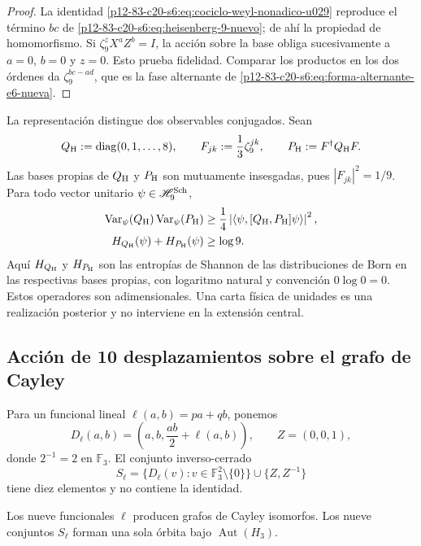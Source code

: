 \begin{proof}
La identidad \eqref{p12-83-c20-s6:eq:cociclo-weyl-nonadico-u029} reproduce el término
\(bc\) de \eqref{p12-83-c20-s6:eq:heisenberg-9-nuevo}; de ahí la propiedad de
homomorfismo. Si \(\zeta_9^zX^aZ^b=I\), la acción sobre la base obliga
sucesivamente a \(a=0\), \(b=0\) y \(z=0\). Esto prueba fidelidad. Comparar
los productos en los dos órdenes da
\(\zeta_9^{bc-ad}\), que es la fase alternante de
\eqref{p12-83-c20-s6:eq:forma-alternante-e6-nueva}.
\end{proof}

La representación distingue dos observables conjugados. Sean
\[
 Q_{\rm H}:=\operatorname{diag}(0,1,\ldots,8),
 \qquad
 F_{jk}:=\frac13\zeta_9^{jk},
 \qquad
 P_{\rm H}:=F^\dagger Q_{\rm H}F.
\]
Las bases propias de \(Q_{\rm H}\) y \(P_{\rm H}\) son mutuamente
insesgadas, pues \(|F_{jk}|^2=1/9\). Para todo vector unitario
\(\psi\in\mathscr H_9^{\rm Sch}\),
\begin{align}
 \operatorname{Var}_\psi(Q_{\rm H})
 \operatorname{Var}_\psi(P_{\rm H})
 &\ge
 \frac14\left|
 \langle\psi,[Q_{\rm H},P_{\rm H}]\psi\rangle
 \right|^2,
 \label{p12-83-c20-s6:eq:incertidumbre-weyl-u029}\\
 H_{Q_{\rm H}}(\psi)+H_{P_{\rm H}}(\psi)
 &\ge\log9.
 \label{p12-83-c20-s6:eq:incertidumbre-entropica-weyl-u029}
\end{align}
Aquí \(H_{Q_{\rm H}}\) y \(H_{P_{\rm H}}\) son las entropías de Shannon
de las distribuciones de Born en las respectivas bases propias,
con logaritmo natural y convención \(0\log0=0\).
Estos operadores son adimensionales. Una carta física de unidades es una
realización posterior y no interviene en la extensión central.

\subsection{Acción de 10 desplazamientos sobre el grafo de Cayley}

Para un funcional lineal
\(\ell(a,b)=pa+qb\), ponemos
\[
 D_\ell(a,b)=\left(a,b,\frac{ab}{2}+\ell(a,b)\right),
 \qquad Z=(0,0,1),
\]
donde \(2^{-1}=2\) en \(\mathbb F_3\). El conjunto inverso-cerrado
\begin{equation}
 S_\ell=
 \{D_\ell(v):v\in\mathbb F_3^2\setminus\{0\}\}
 \cup\{Z,Z^{-1}\}
 \label{p12-83-c20-s6:eq:conjunto-conexion-e6}
\end{equation}
tiene diez elementos y no contiene la identidad.

\begin{theorem}
\label{p12-83-c20-s6:thm:independencia-calibre-e6}
Los nueve funcionales \(\ell\) producen grafos de Cayley isomorfos. Los
nueve conjuntos \(S_\ell\) forman una sola órbita bajo
\(\operatorname{Aut}(H_3)\).
\end{theorem}


